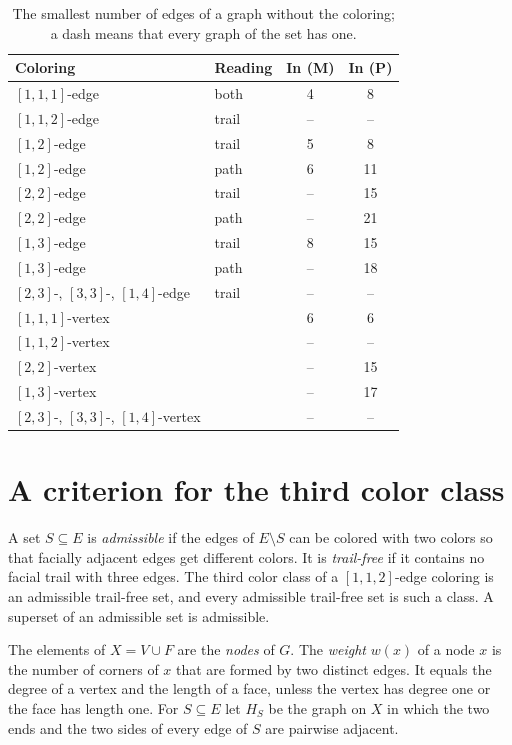 \documentclass[11pt,a4paper]{article}
\begin{document}
\begin{table}[ht]
\centering
\caption{The smallest number of edges of a graph without the coloring; a dash means that every graph of the set has one.}
\label{tab:smallest}
\begin{tabular}{@{}llcc@{}}
\toprule
Coloring & Reading & In (M) & In (P) \\
\midrule
$[1,1,1]$-edge   & both  & 4  & 8  \\
$[1,1,2]$-edge   & trail & -- & -- \\
$[1,2]$-edge     & trail & 5  & 8  \\
$[1,2]$-edge     & path  & 6  & 11 \\
$[2,2]$-edge     & trail & -- & 15 \\
$[2,2]$-edge     & path  & -- & 21 \\
$[1,3]$-edge     & trail & 8  & 15 \\
$[1,3]$-edge     & path  & -- & 18 \\
$[2,3]$-, $[3,3]$-, $[1,4]$-edge & trail & -- & -- \\
\midrule
$[1,1,1]$-vertex &       & 6  & 6  \\
$[1,1,2]$-vertex &       & -- & -- \\
$[2,2]$-vertex   &       & -- & 15 \\
$[1,3]$-vertex   &       & -- & 17 \\
$[2,3]$-, $[3,3]$-, $[1,4]$-vertex & & -- & -- \\
\bottomrule
\end{tabular}
\end{table}

\section{A criterion for the third color class}
\label{sec:criterion}

A set $S\subseteq E$ is \emph{admissible} if the edges of $E\setminus S$ can be colored with two colors so that facially adjacent edges get different colors.
It is \emph{trail-free} if it contains no facial trail with three edges.
The third color class of a $[1,1,2]$-edge coloring is an admissible trail-free set, and every admissible trail-free set is such a class.
A superset of an admissible set is admissible.

The elements of $X=V\cup F$ are the \emph{nodes} of $G$.
The \emph{weight} $w(x)$ of a node $x$ is the number of corners of $x$ that are formed by two distinct edges.
It equals the degree of a vertex and the length of a face, unless the vertex has degree one or the face has length one.
For $S\subseteq E$ let $H_S$ be the graph on $X$ in which the two ends and the two sides of every edge of $S$ are pairwise adjacent.
\end{document}
